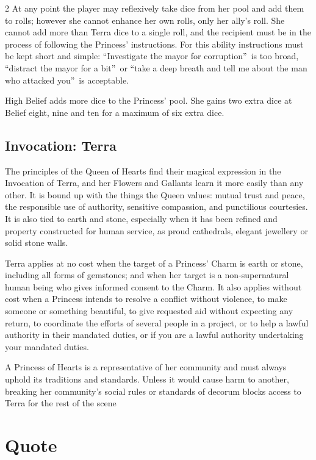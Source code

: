 \begin{multicols}{2}
At any point the player may reflexively take dice from her pool and add them to rolls; however she cannot enhance her own rolls, only her ally's roll. She cannot add more than Terra dice to a single roll, and the recipient must be in the process of following the Princess' instructions. For this ability instructions must be kept short and simple: \textquotedblleft Investigate the mayor for corruption\textquotedblright\, is too broad, \textquotedblleft distract the mayor for a bit\textquotedblright\, or \textquotedblleft take a deep breath and tell me about the man who attacked you\textquotedblright\, is acceptable.

High Belief adds more dice to the Princess' pool. She gains two extra dice at Belief eight, nine and ten for a maximum of six extra dice. 
\subsection*{Invocation: Terra}
The principles of the Queen of Hearts find their magical expression in the Invocation of Terra, and her Flowers and Gallants learn it more easily than any other. It is bound up with the things the Queen values: mutual trust and peace, the responsible use of authority, sensitive compassion, and punctilious courtesies. It is also tied to earth and stone, especially when it has been refined and property constructed for human service, as proud cathedrals, elegant jewellery or solid stone walls.

Terra applies at no cost when the target of a Princess' Charm is earth or stone, including all forms of gemstones; and when her target is a non-supernatural human being who gives informed consent to the Charm. It also applies without cost when a Princess intends to resolve a conflict without violence, to make someone or something beautiful, to give requested aid without expecting any return, to coordinate the efforts of several people in a project, or to help a lawful authority in their mandated duties, or if you are a lawful authority undertaking your mandated duties.

A Princess of Hearts is a representative of her community and must always uphold its traditions and standards. Unless it would cause harm to another, breaking her community's social rules or standards of decorum blocks access to Terra for the rest of the scene

\section*{Quote}


\end{multicols}
